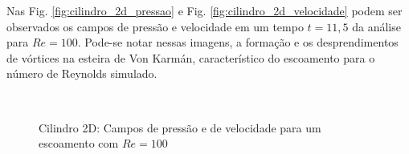 \documentclass[tese_patricia]{subfiles}%
\begin{document}
Nas Fig. \ref{fig:cilindro_2d_pressao} e Fig. \ref{fig:cilindro_2d_velocidade} podem ser observados os campos de pressão e velocidade em um tempo $t=11,5$ da análise para $Re = 100$. Pode-se notar nessas imagens, a formação e os desprendimentos de vórtices na esteira de Von Karmán, característico do escoamento para o número de Reynolds simulado.

\begin{figure}[!htb]
	\centering
	\\ 
	\caption{Cilindro 2D: Campos de pressão e de velocidade para um escoamento com $Re = 100$ }
	\label{fig:cilindro_campos}
\end{figure}
\end{document}
